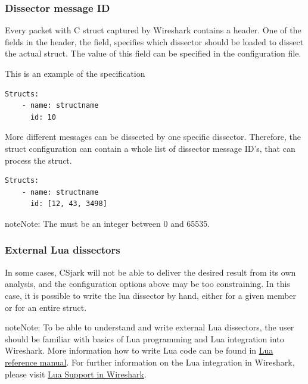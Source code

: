 \documentclass[A4paper,10pt,english]{sphinxmanual}
\begin{document}
\subsubsection{Dissector message ID}
\label{user/config:dissector-message-id}\label{user/config:ids}
Every packet with C struct captured by Wireshark contains a header. One of the fields in the header, the  field, specifies which dissector should be loaded to dissect the actual struct. The value of this field can be specified in the configuration file.

This is an example of the specification

\begin{Verbatim}[commandchars=\\\{\}]
Structs:
    - name: structname
      id: 10
\end{Verbatim}

More different messages can be dissected by one specific dissector. Therefore, the struct configuration can contain a whole list of dissector message ID's, that can process the struct.

\begin{Verbatim}[commandchars=\\\{\}]
Structs:
    - name: structname
      id: [12, 43, 3498]
\end{Verbatim}

\begin{notice}{note}{Note:}
The  must be an integer between 0 and 65535.
\end{notice}


\subsubsection{External Lua dissectors}
\label{user/config:external-lua-dissectors}
In some cases, CSjark will not be able to deliver the desired result from its own analysis, and the configuration options above may be too constraining. In this case, it is possible to write the lua dissector by hand, either for a given member or for an entire struct.

\begin{notice}{note}{Note:}
To be able to understand and write external Lua dissectors, the user should be familiar with basics of Lua programming and Lua integration into Wireshark.
More information how to write Lua code can be found in \href{http://www.lua.org/manual/5.1/}{Lua reference manual}. For further information on the Lua integration in Wireshark, please visit \href{http://www.Wireshark.org/docs/wsug\_html\_chunked/wsluarm.html}{Lua Support in Wireshark}.
\end{notice}
\end{document}
